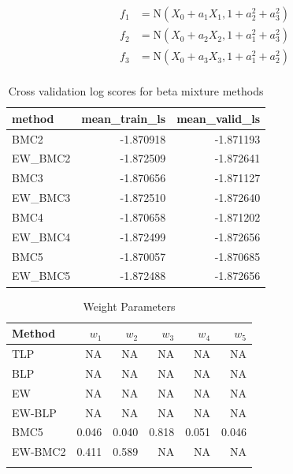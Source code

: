 \documentclass[
]{article}
\begin{document}
\[
\begin{aligned}
f_1&=\text{N}(X_0+a_1X_1,1+a^2_2+a^2_3)\\
f_2&=\text{N}(X_0+a_2X_2,1+a^2_1+a^2_3)\\
f_3&=\text{N}(X_0+a_3X_3,1+a^2_1+a^2_2)\\
\end{aligned}
\]

\begin{table}[H]

\caption{\label{tab:unnamed-chunk-4}Cross validation log scores for beta mixture methods}
\centering
\fontsize{8}{10}\selectfont
\begin{tabular}[t]{l|r|r}
\hline
method & mean\_train\_ls & mean\_valid\_ls\\
\hline
BMC2 & -1.870918 & -1.871193\\
\hline
EW\_BMC2 & -1.872509 & -1.872641\\
\hline
BMC3 & -1.870656 & -1.871127\\
\hline
EW\_BMC3 & -1.872510 & -1.872640\\
\hline
BMC4 & -1.870658 & -1.871202\\
\hline
EW\_BMC4 & -1.872499 & -1.872656\\
\hline
BMC5 & -1.870057 & -1.870685\\
\hline
EW\_BMC5 & -1.872488 & -1.872656\\
\hline
\end{tabular}
\end{table}

\begin{table}[H]

\caption{\label{tab:unnamed-chunk-4}Weight Parameters}
\centering
\fontsize{8}{10}\selectfont
\begin{tabular}[t]{lrrrrr}
\toprule{}
Method & $w_1$ & $w_2$ & $w_3$ & $w_4$ & $w_5$\\
\midrule{}
TLP & NA & NA & NA & NA & NA\\
BLP & NA & NA & NA & NA & NA\\
EW & NA & NA & NA & NA & NA\\
EW-BLP & NA & NA & NA & NA & NA\\
BMC5 & 0.046 & 0.040 & 0.818 & 0.051 & 0.046\\
\addlinespace
EW-BMC2 & 0.411 & 0.589 & NA & NA & NA\\
\bottomrule{}
\end{tabular}
\end{table}
\end{document}

